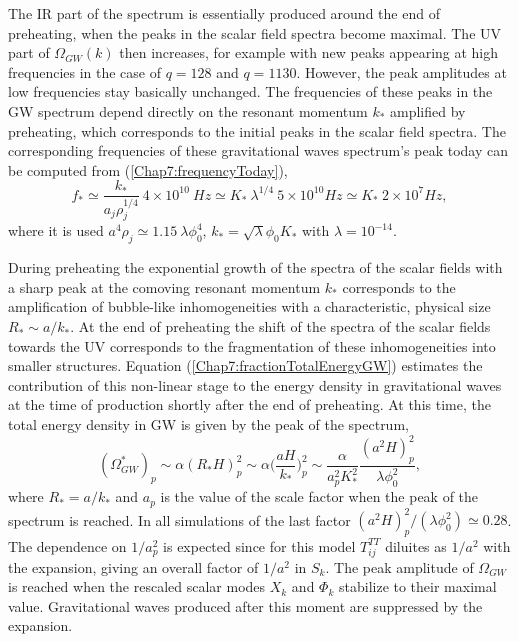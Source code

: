 \documentclass[11pt,a4paper,twoside]{book}
\begin{document}
The IR part of the spectrum is essentially produced around the end of preheating, when the peaks in the scalar field spectra  become maximal. The UV part of $\Omega_{GW}(k)$ then increases, for example with new peaks appearing at high frequencies in the case of $ q=128 $ and $ q=1130 $. However, the peak amplitudes at low frequencies stay basically unchanged. The frequencies of these peaks in the GW spectrum depend directly on the resonant momentum $ k_{*} $ amplified by preheating, which corresponds to the initial peaks in the scalar field spectra. The corresponding frequencies of these gravitational waves spectrum's peak today can be computed from (\ref{Chap7:frequencyToday}),
\begin{equation}
	\label{Chap7:frequencyTodayResonance}
	f_{*}\simeq \frac{k_{*}}{a_{j}\rho_{j}^{1/4}}\ 4 \times 10^{10}\ Hz \simeq K_{*}\ \lambda^{1/4}\ 5 \times 10^{10} Hz \simeq K_{*}\ 2 \times 10^{7} Hz, 
\end{equation}
where it is used $ a^{4}\rho_{j} \simeq 1.15\ \lambda \phi_{0}^{4} $, $ k_{*}=\sqrt{\lambda}\phi_{0}K_{*} $ with $\lambda = 10^{-14}$. 

During preheating the exponential growth of the spectra of the scalar fields with a sharp peak at the comoving resonant momentum $ k_{*} $ corresponds to the amplification of bubble-like inhomogeneities with a characteristic, physical size $ R_{*} \sim a/k_{*} $. At the end of preheating the shift of the spectra of the scalar fields towards the UV corresponds to the fragmentation of these inhomogeneities into smaller structures. Equation (\ref{Chap7:fractionTotalEnergyGW}) estimates the contribution of this non-linear stage to the energy density in gravitational waves at the time of production shortly after the end of preheating. At this time, the total energy density in GW is given by the peak of the spectrum,
\begin{equation}
\label{Chap7:GWBubblePhase}
(\Omega^{*}_{GW})_{p} \sim \alpha (R_{*} H)^{2}_{p} \sim \alpha \Bigg(\frac{aH}{k_{*}}\Bigg)^{2}_{p} \sim \frac{\alpha}{a^{2}_{p} K_{*}^{2}} \frac{(a^{2}H)_{p}^{2}}{\lambda \phi_{0}^{2}},
\end{equation}
where $ R_{*}=a/k_{*} $ and $ a_{p} $ is the value of the scale factor when the peak of the spectrum is reached. In all simulations of \cite{Chap7:GreenMethod} the last factor $  (a^{2}H)_{p}^{2}/(\lambda \phi_{0}^{2}) \simeq 0.28  $. The dependence on $ 1/a_{p}^{2} $ is expected since for this model $ T^{TT}_{ij} $ diluites as $ 1/a^{2} $ with the expansion, giving an overall factor of $ 1/a^{2} $ in $ S_{k} $. The peak amplitude  of $ \Omega_{GW} $ is reached  when the rescaled scalar modes $ X_{k} $ and $ \Phi_{k} $ stabilize to their maximal value. Gravitational waves produced after this moment are suppressed by the expansion.
\end{document}
